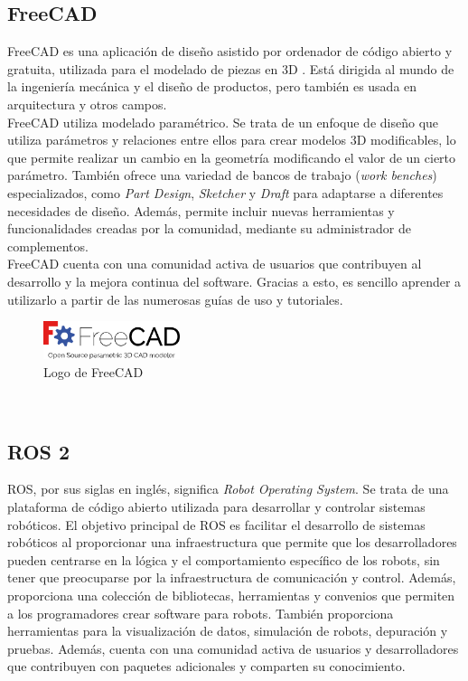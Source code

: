 \subsection{FreeCAD}
\label{subsec:freecad}
FreeCAD es una aplicación de diseño asistido por ordenador de código abierto y gratuita, utilizada para el modelado de piezas en 3D .
Está dirigida al mundo de la ingeniería mecánica y el diseño de productos, pero también es usada en arquitectura y otros campos.
\\FreeCAD utiliza modelado paramétrico. Se trata de un enfoque de diseño que utiliza parámetros y relaciones entre ellos para 
crear modelos 3D modificables, lo que permite realizar un cambio en la geometría modificando el valor de un cierto parámetro.
También ofrece una variedad de bancos de trabajo (\textit{work benches}) especializados, como \textit{Part Design}, \textit{Sketcher} y \textit{Draft} para adaptarse a diferentes 
necesidades de diseño. Además, permite incluir nuevas herramientas y funcionalidades creadas por la comunidad, mediante su administrador 
de complementos.
\\FreeCAD cuenta con una comunidad activa de usuarios que contribuyen al desarrollo y la mejora continua del software. Gracias a esto, 
es sencillo aprender a utilizarlo a partir de las numerosas guías de uso y tutoriales.
\begin{figure} [h!]
  \begin{center}
    \includegraphics[width=4cm]{figs/freecad.png}
  \end{center}
  \caption{Logo de FreeCAD}
  \label{fig:freecadlogo}
\end{figure}\ 

\subsection{ROS 2}
\label{subsec:ros2}
ROS, por sus siglas en inglés, significa \textit{Robot Operating System}. Se trata de una plataforma de código abierto utilizada 
para desarrollar y controlar sistemas robóticos.
El objetivo principal de ROS es facilitar el desarrollo de sistemas robóticos al proporcionar una infraestructura que permite que
los desarrolladores pueden centrarse en la lógica y el comportamiento específico de los robots, sin tener que preocuparse por la 
infraestructura de comunicación y control. 
Además, proporciona una colección de bibliotecas, herramientas y convenios que permiten a los programadores crear software para robots. 
También proporciona herramientas para la visualización de datos, simulación de robots, depuración y pruebas. Además, 
cuenta con una comunidad activa de usuarios y desarrolladores que contribuyen con paquetes adicionales y comparten su 
conocimiento.

